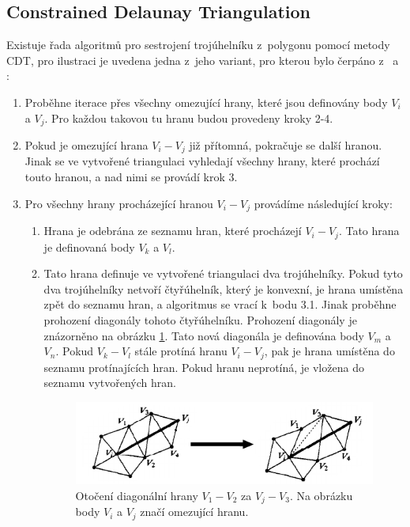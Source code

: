\subsection*{Constrained Delaunay Triangulation}
Existuje řada algoritmů pro sestrojení trojúhelníku z~polygonu pomocí metody CDT, pro ilustraci je uvedena jedna z~jeho variant, pro kterou bylo čerpáno z~\cite{cdt-book} a \cite{cdt}:

\begin{enumerate}[label*=\arabic*.]
    \item Proběhne iterace přes všechny omezující hrany, které jsou definovány body $V_i$ a $V_j$. Pro každou takovou tu hranu budou provedeny kroky 2-4.
    \item Pokud je omezující hrana $V_i-V_j$ již přítomná, pokračuje se další hranou. Jinak se ve vytvořené triangulaci vyhledají všechny hrany, které prochází touto hranou, a nad nimi se provádí krok 3.
    \item Pro všechny hrany procházející hranou $V_i-V_j$ provádíme následující kroky:
    \begin{enumerate}[label*=\arabic*.]
        \item Hrana je odebrána ze seznamu hran, které procházejí $V_i-V_j$. Tato hrana je definovaná body $V_k$ a $V_l$.
        \item Tato hrana definuje ve vytvořené triangulaci dva trojúhelníky. Pokud tyto dva trojúhelníky netvoří čtyřúhelník, který je konvexní, je hrana umístěna zpět do seznamu hran, a algoritmus se vrací k~bodu 3.1. Jinak proběhne prohození diagonály tohoto čtyřúhelníku. Prohození diagonály je znázorněno na obrázku \ref{cdt-flip-img}. Tato nová diagonála je definována body $V_m$ a $V_n$. Pokud $V_k-V_l$ stále protíná hranu $V_i-V_j$, pak je hrana umístěna do seznamu protínajících hran. Pokud hranu neprotíná, je vložena do seznamu vytvořených hran.
        \begin{figure}[H]
	\centering
	\includegraphics[width=30em]{images/triangulation/cdt.png}
	\caption[caption]{Otočení diagonální hrany $V_1-V_2$ za $V_j-V_3$. Na obrázku body $V_i$ a $V_j$ značí omezující hranu.\footnotemark}
	\label{cdt-flip-img}
\end{figure}

\end{enumerate}
\end{enumerate}
